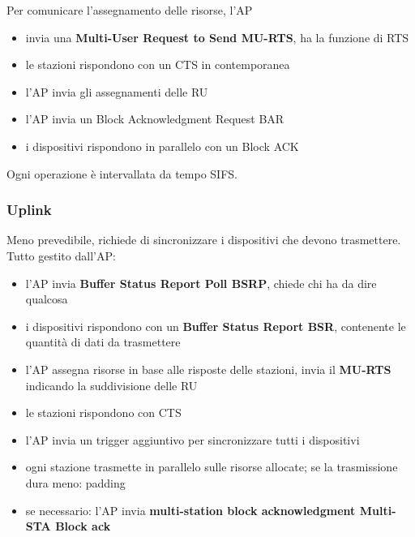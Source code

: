 Per comunicare l'assegnamento delle risorse, l'AP
\begin{itemize}
    \item invia una \textbf{Multi-User Request to Send MU-RTS}, ha la funzione di RTS
    
    \item le stazioni rispondono con un CTS in contemporanea
    
    \item l'AP invia gli assegnamenti delle RU
    
    \item l'AP invia un Block Acknowledgment Request BAR
    
    \item i dispositivi rispondono in parallelo con un Block ACK 
\end{itemize}
Ogni operazione è intervallata da tempo SIFS.

\subsubsection{Uplink}

Meno prevedibile, richiede di sincronizzare i dispositivi che devono trasmettere. Tutto gestito dall'AP: 
\begin{itemize}
    \item l'AP invia \textbf{Buffer Status Report Poll BSRP}, chiede chi ha da dire qualcosa
    
    \item i dispositivi rispondono con un \textbf{Buffer Status Report BSR}, contenente le quantità di dati da trasmettere
    
    \item l'AP assegna risorse in base alle risposte delle stazioni, invia il \textbf{MU-RTS} indicando la suddivisione delle RU
    
    \item le stazioni rispondono con CTS
    
    \item l'AP invia un trigger aggiuntivo per sincronizzare tutti i dispositivi
    
    \item ogni stazione trasmette in parallelo sulle risorse allocate; se la trasmissione dura meno: padding
    
    \item se necessario: l'AP invia \textbf{multi-station block acknowledgment Multi-STA Block ack}
\end{itemize}

